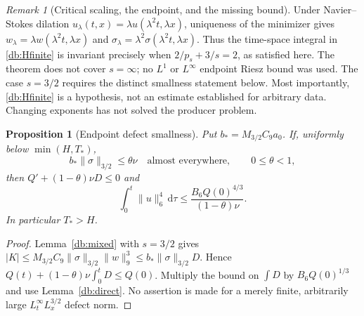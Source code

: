 \documentclass[11pt,a4paper]{article}
\newtheorem{proposition}[theorem]{Proposition}
\theoremstyle{definition}\newtheorem{hypothesis}[theorem]{Hypothesis}
\theoremstyle{remark}\newtheorem{remark}[theorem]{Remark}
\newcommand{\dd}{\,\mathrm d}
\newcommand{\norm}[1]{\lVert #1\rVert}
\numberwithin{equation}{section}
\begin{document}
\begin{remark}[Critical scaling, the endpoint, and the missing bound]
Under Navier--Stokes dilation $u_\lambda(t,x)=\lambda u(\lambda^2t,\lambda x)$,
uniqueness of the minimizer gives
$w_\lambda=\lambda w(\lambda^2t,\lambda x)$ and
$\sigma_\lambda=\lambda^2\sigma(\lambda^2t,\lambda x)$.
Thus the time-space integral in \eqref{db:Hfinite} is invariant precisely
when $2/p_s+3/s=2$, as satisfied here. The theorem does not cover $s=\infty$;
no $L^1$ or $L^\infty$ endpoint Riesz bound was used. The case $s=3/2$
requires the distinct smallness statement below. Most importantly,
\eqref{db:Hfinite} is a hypothesis, not an estimate established for arbitrary
data. Changing exponents has not solved the producer problem.
\end{remark}

\begin{proposition}[Endpoint defect smallness]\label{db:endpoint}
Put $b_*=M_{3/2}C_9a_0$. If, uniformly below $\min(H,T_*)$,
\[
 b_*\norm\sigma_{3/2}\le\theta\nu\quad\text{almost everywhere},
 \qquad 0\le\theta<1,
\]
then $Q'+(1-\theta)\nu D\le0$ and
\[
 \int_0^t\norm u_6^4\dd\tau
 \le\frac{B_6Q(0)^{4/3}}{(1-\theta)\nu}.
\]
In particular $T_*>H$.
\end{proposition}
\begin{proof}
Lemma~\ref{db:mixed} with $s=3/2$ gives
$|K|\le M_{3/2}C_9\norm\sigma_{3/2}\norm w_9^3
\le b_*\norm\sigma_{3/2}D$.
Hence $Q(t)+(1-\theta)\nu\int_0^tD\le Q(0)$. Multiply the bound on
$\int D$ by $B_6Q(0)^{1/3}$ and use Lemma~\ref{db:direct}.
No assertion is made for a merely finite, arbitrarily large
$L^\infty_tL^{3/2}_x$ defect norm.
\end{proof}
\end{document}
